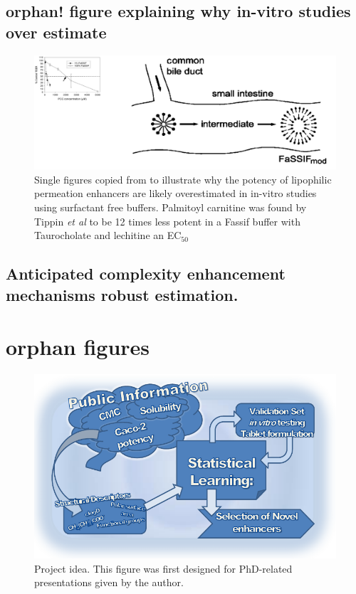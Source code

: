 \subsection{orphan! figure explaining why in-vitro studies over estimate}
\begin{figure}[!htpb]
\label{devel_fassif}
\includegraphics[width=\textwidth,height=\textheight,keepaspectratio]{graphics/devel_Fasssif_PCC2.png}
\caption{Single figures copied from \cite{tippin2008biorelevant,nawroth2011liposome} to illustrate why the potency of lipophilic permeation enhancers are likely overestimated in in-vitro studies using surfactant free buffers. Palmitoyl carnitine was found by Tippin \textit{et al} to be 12 times less potent in a Fassif buffer with Taurocholate and lechitine an EC$_{50}$}
\end{figure}


\subsection{Anticipated complexity enhancement mechanisms robust estimation.}
\label{modelComplexity}

\section{orphan figures}




\begin{figure}[htbp]
\label{workSummary}
\includegraphics{graphics/workSummary_130mm.pdf}
\caption{Project idea. This figure was first designed for PhD-related presentations given by the author.}
\end{figure}


